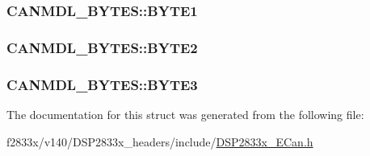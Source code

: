 \subsubsection[{B\+Y\+T\+E1}]{ C\+A\+N\+M\+D\+L\+\_\+\+B\+Y\+T\+E\+S\+::\+B\+Y\+T\+E1}\label{struct_c_a_n_m_d_l___b_y_t_e_s_a84a22e10527ea821b49c23afc9ff866a}
\hypertarget{struct_c_a_n_m_d_l___b_y_t_e_s_ae150a0160d9fdf492ddbc37ea0d4e93e}{}
\subsubsection[{B\+Y\+T\+E2}]{ C\+A\+N\+M\+D\+L\+\_\+\+B\+Y\+T\+E\+S\+::\+B\+Y\+T\+E2}\label{struct_c_a_n_m_d_l___b_y_t_e_s_ae150a0160d9fdf492ddbc37ea0d4e93e}
\hypertarget{struct_c_a_n_m_d_l___b_y_t_e_s_abdcd3e7db708e4a0c2a1a1583bac4385}{}
\subsubsection[{B\+Y\+T\+E3}]{ C\+A\+N\+M\+D\+L\+\_\+\+B\+Y\+T\+E\+S\+::\+B\+Y\+T\+E3}\label{struct_c_a_n_m_d_l___b_y_t_e_s_abdcd3e7db708e4a0c2a1a1583bac4385}


The documentation for this struct was generated from the following file\+:\begin{DoxyCompactItemize}
\item 
f2833x/v140/\+D\+S\+P2833x\+\_\+headers/include/\hyperlink{_d_s_p2833x___e_can_8h}{D\+S\+P2833x\+\_\+\+E\+Can.\+h}\end{DoxyCompactItemize}
